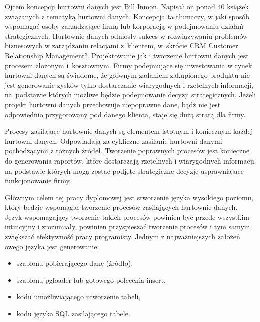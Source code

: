 Ojcem koncepcji hurtowni danych jest Bill Inmon.
Napisał on ponad 40 książek związanych z tematyką hurtowni danych.
Koncepcja ta tłumaczy,
 w jaki sposób wspomagać osoby zarządzające firmą lub korporacją w podejmowaniu działań strategicznych.
Hurtownie danych odniosły sukces w rozwiązywaniu problemów biznesowych w zarządzaniu relacjami z~klientem,
 w~skrócie CRM \ang{Customer Relationship Management}.
Projektowanie jak i tworzenie hurtowni danych jest procesem złożonym i~kosztownym.
 Firmy podejmujące się inwestowania w rynek hurtowni danych są świadome, 
 że głównym zadaniem zakupionego produktu nie jest generowanie zysków tylko dostarczanie wiarygodnych i rzetelnych informacji, 
 na~podstawie których możliwe będzie podejmowanie decyzji strategicznych.
Jeżeli projekt hurtowni danych przechowuje niepoprawne dane, 
 bądź nie jest odpowiednio przygotowany pod danego klienta,
 staje się dużą stratą dla firmy.\cite{TodMan}

Procesy zasilające hurtownie danych są elementem istotnym i koniecznym każdej hurtowni danych.
Odpowiadają za cykliczne zasilanie hurtowni danymi pochodzącymi z różnych źródeł. 
Tworzenie poprawnych procesów jest konieczne do generowania raportów,
 które dostarczają rzetelnych i wiarygodnych informacji,
 na podstawie których mogą zostać podjęte strategiczne decyzje usprawniające funkcjonowanie firmy.

Głównym celem tej pracy dyplomowej jest stworzenie języka wysokiego poziomu,
który będzie wspomagał tworzenie procesów zasilających hurtownie danych. 
Język wspomagający tworzenie takich procesów powinien być 
 przede wszystkim intuicyjny i zrozumiały,
 powinien przyspieszać tworzenie procesów i tym samym zwiększać 
 efektywność pracy programisty.
Jednym z najważniejszych założeń owego języka jest generowanie:
\begin{itemize}
 \item szablonu pobierającego dane (źródło),
 \item szablonu pgloader lub gotowego polecenia insert,
 \item kodu umożliwiającego utworzenie tabeli,
 \item kodu języka SQL zasilającego tabele.
\end{itemize}

